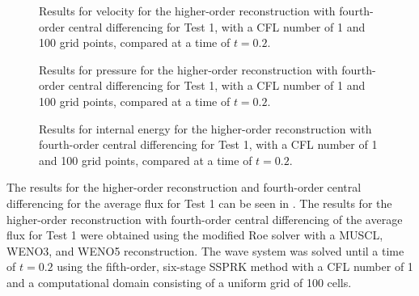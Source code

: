 \begin{figure}
	\caption[Results for velocity for the higher-order reconstruction with fourth-order central differencing for Test 1, with a CFL number of 1 and 100 grid points, compared at a time of $t=0.2$.]{Results for velocity for the higher-order reconstruction with fourth-order central differencing for Test 1, with a CFL number of 1 and 100 grid points, compared at a time of $t=0.2$.}
	\label{fig:Test1HORCD4velocity}
\end{figure}

\begin{figure}
	\caption[Results for pressure for the higher-order reconstruction with fourth-order central differencing for Test 1, with a CFL number of 1 and 100 grid points, compared at a time of $t=0.2$.]{Results for pressure for the higher-order reconstruction with fourth-order central differencing for Test 1, with a CFL number of 1 and 100 grid points, compared at a time of $t=0.2$.}
	\label{fig:Test1HORCD4pressure}
\end{figure}

\begin{figure}
	\caption[Results for internal energy for the higher-order reconstruction with fourth-order central differencing for Test 1, with a CFL number of 1 and 100 grid points, compared at a time of $t=0.2$.]{Results for internal energy for the higher-order reconstruction with fourth-order central differencing for Test 1, with a CFL number of 1 and 100 grid points, compared at a time of $t=0.2$.}
	\label{fig:Test1HORCD4energy}
\end{figure}
The results for the higher-order reconstruction and fourth-order central differencing for the average flux for Test 1 can be seen in . The results for the higher-order reconstruction with fourth-order central differencing of the average flux for Test 1 were obtained using the modified Roe solver with a MUSCL, WENO3, and WENO5 reconstruction. The wave system was solved until a time of $t=0.2$ using the fifth-order, six-stage SSPRK method with a CFL number of 1 and a computational domain consisting of a uniform grid of 100 cells.

